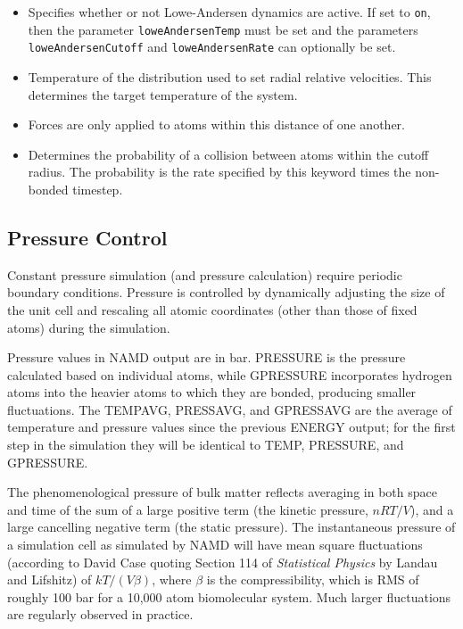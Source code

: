 \begin{itemize}

\item
{}
{Specifies whether or not Lowe-Andersen dynamics are active.
If set to {\tt on}, then the parameter {\tt loweAndersenTemp} must be set and the parameters {\tt loweAndersenCutoff} and {\tt loweAndersenRate} can optionally be set.}

\item
{}
{Temperature of the distribution used to set radial relative velocities.
This determines the target temperature of the system.}

\item
{}
{Forces are only applied to atoms within this distance of one another.}

\item
{}
{Determines the probability of a collision between atoms within the cutoff radius.
The probability is the rate specified by this keyword times the non-bonded timestep.}

\end{itemize}


\subsection{Pressure Control}

Constant pressure simulation (and pressure calculation) require periodic
boundary conditions.  Pressure is controlled by dynamically adjusting
the size of the unit cell and rescaling all atomic coordinates (other than
those of fixed atoms) during the simulation.

Pressure values in NAMD output are in bar.
PRESSURE is the pressure calculated based on individual atoms, while
GPRESSURE incorporates hydrogen atoms into the heavier atoms to which
they are bonded, producing smaller fluctuations.
The TEMPAVG, PRESSAVG, and GPRESSAVG are the average of temperature and
pressure values since the previous ENERGY output; for the first step
in the simulation they will be identical to TEMP, PRESSURE, and GPRESSURE.

The phenomenological pressure of bulk matter reflects averaging in both
space and time of the sum of a large positive term (the kinetic pressure,
$nRT/V$), and a large cancelling negative term (the static pressure).
The instantaneous pressure of a simulation cell as simulated by NAMD
will have mean square fluctuations (according to David Case quoting
Section 114 of {\em Statistical Physics} by Landau and Lifshitz)
of $kT/(V \beta)$, where $\beta$ is the compressibility, which is
RMS of roughly 100 bar for a 10,000 atom biomolecular system.
Much larger fluctuations are regularly observed in practice.


